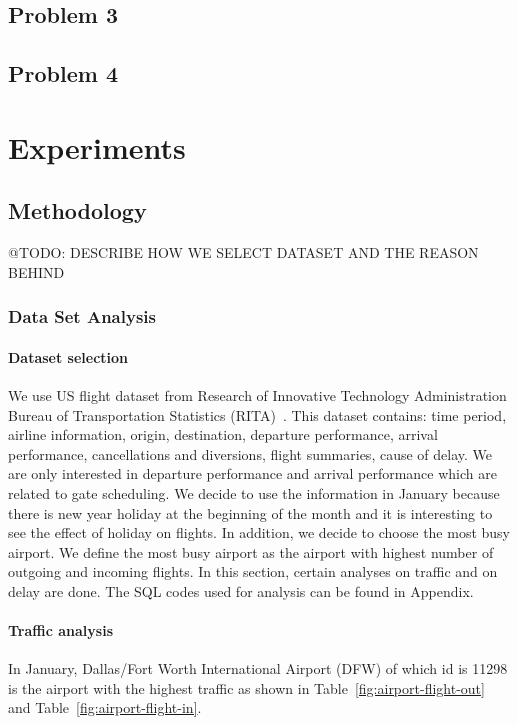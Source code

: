 \documentclass[11pt,a4paper]{article}
\begin{document}
\subsection{Problem 3}
\label{subsec:algo-prob3}

\subsection{Problem 4}
\label{subsec:algo-prob4}

\section{Experiments}
\label{sec:expe}

\subsection{Methodology}
\label{subsec:expo-meth}
@TODO: DESCRIBE HOW WE SELECT DATASET AND THE REASON BEHIND

\subsubsection{Data Set Analysis}
\label{subsec:expo-data}
\paragraph{Dataset selection}
We use US flight dataset from Research of Innovative Technology Administration Bureau of Transportation Statistics (RITA)~\cite{rita}. This dataset contains: time period, airline information, origin, destination, departure performance, arrival performance, cancellations and diversions, flight summaries, cause of delay. We are only interested in departure performance and arrival performance which are related to gate scheduling. We decide to use the information in January because there is new year holiday at the beginning of the month and it is interesting to see the effect of holiday on flights. In addition, we decide to choose the most busy airport. We define the most busy airport as the airport with highest number of outgoing and incoming flights. In this section, certain analyses on traffic and on delay are done. The SQL codes used for analysis can be found in Appendix.

\paragraph{Traffic analysis}
In January, Dallas/Fort Worth International Airport (DFW) of which id is 11298 is the airport with the highest traffic as shown in Table~\ref{fig:airport-flight-out} and Table~\ref{fig:airport-flight-in}.\par
\end{document}
